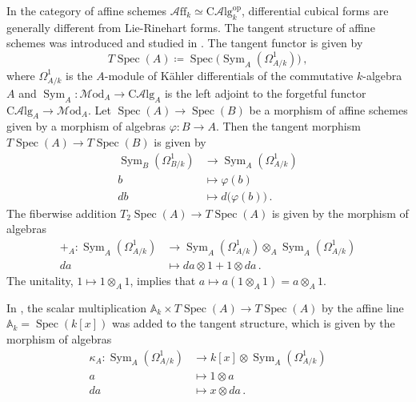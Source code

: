 \documentclass[12pt,reqno, a4paper]{amsart}
\numberwithin{equation}{section}
\theoremstyle{plain}
\theoremstyle{definition}
\theoremstyle{remark}
\newcommand{\bbA}{\mathbb{A}}
\newcommand{\op}{\mathrm{op}}
\newcommand{\Mod}{{\mathcal{M}\mathrm{od}}}
\newcommand{\Aff}{{\mathcal{A}\mathrm{ff}}}
\newcommand{\CAlg}{{\mathrm{C}\mathcal{A}\mathrm{lg}}}
\DeclareMathOperator{\Sym}{Sym}
\DeclareMathOperator{\Spec}{Spec}
\renewcommand{\phi}{\varphi}
\begin{document}
In the category of affine schemes $\Aff_k \simeq \CAlg_k^\op$, differential cubical forms are generally different from Lie-Rinehart forms. The tangent structure of affine schemes was introduced and studied in \cite[\S 4.1]{CruttwellLemay:2023}. The tangent functor is given by
\begin{equation*}
  T\Spec(A)
  \coloneqq \Spec\bigl( \Sym_A(\Omega^1_{A/k}) \bigr)
  \,,
\end{equation*}
where $\Omega^1_{A/k}$ is the $A$-module of K\"ahler differentials of the commutative $k$-algebra $A$ and $\Sym_A: \Mod_A \to \CAlg_A$ is the left adjoint to the forgetful functor $\CAlg_A \to \Mod_A$. Let $\Spec(A) \to \Spec(B)$ be a morphism of affine schemes given by a morphism of algebras $\phi: B \to A$. Then the tangent morphism $T\Spec(A) \to T\Spec(B)$ is given by
\begin{align*}
  \Sym_B(\Omega^1_{B/k})
  &\longrightarrow
  \Sym_A(\Omega^1_{A/k})
  \\
  b &\longmapsto \phi(b)
  \\
  db &\longmapsto d\bigl( \phi(b) \bigr)
  \,.
\end{align*}
The fiberwise addition $T_2 \Spec(A) \to T\Spec(A)$ is given by the morphism of algebras
\begin{align*}
  +_A:
  \Sym_A(\Omega^1_{A/k})
  &\longrightarrow
  \Sym_A(\Omega^1_{A/k}) \otimes_A \Sym_A(\Omega^1_{A/k})
  \\
  da &\longmapsto da \otimes 1 + 1 \otimes da
  \,.
\end{align*}
The unitality, $1 \mapsto 1 \otimes_A 1$, implies that $a \mapsto a (1 \otimes_A 1) = a \otimes_A 1$.

In \cite[\S 7.7]{AintablianBlohmann:2026}, the scalar multiplication $\bbA_k \times T\Spec(A) \to T\Spec(A)$ by the affine line $\bbA_k = \Spec(k[x])$ was added to the tangent structure, which is given by the morphism of algebras
\begin{align*}
  \kappa_A: \Sym_A(\Omega^1_{A/k})
  &\longrightarrow k[x] \otimes \Sym_A(\Omega^1_{A/k})
  \\
  a
  &\longmapsto 1 \otimes a
  \\
  da
  &\longmapsto x \otimes da
  \,.
\end{align*}
\end{document}
